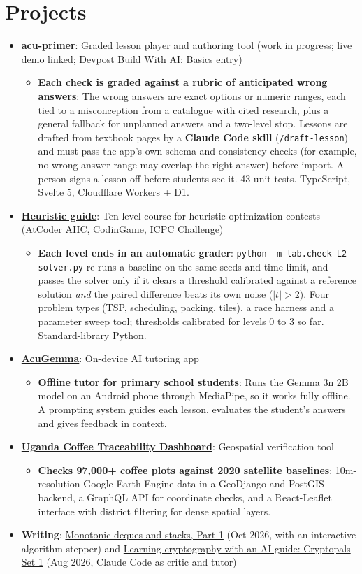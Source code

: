 \documentclass[letterpaper,11pt]{article}
\newcommand{\resumeItem}[2]{
  \item\small{
    \textbf{#1}{: #2 \vspace{-2pt}}
  }
}
\newcommand{\resumeSubItem}[2]{\resumeItem{#1}{#2}\vspace{-4pt}}
\newcommand{\resumeSubHeadingListStart}{\begin{itemize}[leftmargin=*]}
\newcommand{\resumeSubHeadingListEnd}{\end{itemize}}
\newcommand{\resumeItemListStart}{\begin{itemize}}
\newcommand{\resumeItemListEnd}{\end{itemize}\vspace{-5pt}}
\begin{document}
\section{Projects}
  \resumeSubHeadingListStart
    \resumeSubItem{\href{https://acu-primer.cmplxxyttmt.workers.dev}{acu-primer}}
      {Graded lesson player and authoring tool (work in progress; live demo linked; Devpost Build With AI: Basics entry)}
      \resumeItemListStart
        \resumeItem{Each check is graded against a rubric of anticipated wrong answers}
          {The wrong answers are exact options or numeric ranges, each tied to a misconception from a catalogue with cited research, plus a general fallback for unplanned answers and a two-level stop. Lessons are drafted from textbook pages by a \textbf{Claude Code skill} (\texttt{/draft-lesson}) and must pass the app's own schema and consistency checks (for example, no wrong-answer range may overlap the right answer) before import. A person signs a lesson off before students see it. 43 unit tests. TypeScript, Svelte 5, Cloudflare Workers + D1.}
      \resumeItemListEnd
    \resumeSubItem{\href{https://github.com/cmplx-xyttmt/heuristic-guide}{Heuristic guide}}
      {Ten-level course for heuristic optimization contests (AtCoder AHC, CodinGame, ICPC Challenge)}
      \resumeItemListStart
        \resumeItem{Each level ends in an automatic grader}
          {\texttt{python -m lab.check L2 solver.py} re-runs a baseline on the same seeds and time limit, and passes the solver only if it clears a threshold calibrated against a reference solution \emph{and} the paired difference beats its own noise ($|t| > 2$). Four problem types (TSP, scheduling, packing, tiles), a race harness and a parameter sweep tool; thresholds calibrated for levels 0 to 3 so far. Standard-library Python.}
      \resumeItemListEnd
    \resumeSubItem{\href{https://github.com/cmplx-xyttmt/acu-gemma}{AcuGemma}}
      {On-device AI tutoring app}
      \resumeItemListStart
        \resumeItem{Offline tutor for primary school students}
        {Runs the Gemma 3n 2B model on an Android phone through MediaPipe, so it works fully offline. A prompting system guides each lesson, evaluates the student's answers and gives feedback in context.}
      \resumeItemListEnd
    \resumeSubItem{\href{https://github.com/cmplx-xyttmt/uganda-coffee-traceability}{Uganda Coffee Traceability Dashboard}}
      {Geospatial verification tool}
      \resumeItemListStart
        \resumeItem{Checks 97,000+ coffee plots against 2020 satellite baselines}
        {10m-resolution Google Earth Engine data in a GeoDjango and PostGIS backend, a GraphQL API for coordinate checks, and a React-Leaflet interface with district filtering for dense spatial layers.}
      \resumeItemListEnd
    \resumeSubItem{Writing}
      {\href{https://cmplx-xyttmt.github.io/posts/7_monotonic_deque/}{Monotonic deques and stacks, Part 1} (Oct 2026, with an interactive algorithm stepper) and \href{https://cmplx-xyttmt.github.io/posts/6_cryptopals_ai_tutor/}{Learning cryptography with an AI guide: Cryptopals Set 1} (Aug 2026, Claude Code as critic and tutor)}
  \resumeSubHeadingListEnd
\end{document}
